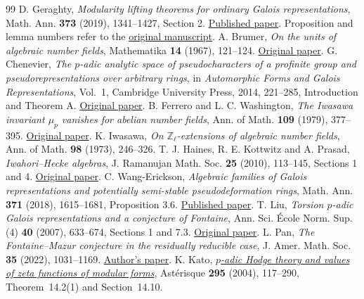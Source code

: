 \documentclass[a4paper,11pt]{article}
\theoremstyle{definition}
\theoremstyle{remark}
\newcommand{\ZZ}{\mathbb Z}\newcommand{\ord}{\operatorname{ord}}
\numberwithin{equation}{section}
\begin{document}
\begin{thebibliography}{99}
 D. Geraghty, \emph{Modularity lifting theorems for ordinary Galois representations}, Math. Ann. \textbf{373} (2019), 1341--1427, Section 2. \href{https://doi.org/10.1007/s00208-018-1742-4}{Published paper}. Proposition and lemma numbers refer to the \href{https://citeseerx.ist.psu.edu/document?doi=8faa2d675c94ae78d0ac8ebb3f9d4f69ede42d44\&repid=rep1\&type=pdf}{original manuscript}.
 A. Brumer, \emph{On the units of algebraic number fields}, Mathematika \textbf{14} (1967), 121--124. \href{https://doi.org/10.1112/S0025579300003703}{Original paper}.
 G. Chenevier, \emph{The \(p\)-adic analytic space of pseudocharacters of a profinite group and pseudorepresentations over arbitrary rings}, in \emph{Automorphic Forms and Galois Representations}, Vol.~1, Cambridge University Press, 2014, 221--285, Introduction and Theorem A. \href{https://gaetan.chenevier.perso.math.cnrs.fr/articles/determinants.pdf}{Original paper}.
 B. Ferrero and L. C. Washington, \emph{The Iwasawa invariant \(\mu_p\) vanishes for abelian number fields}, Ann. of Math. \textbf{109} (1979), 377--395. \href{https://doi.org/10.2307/1971116}{Original paper}.
 K. Iwasawa, \emph{On \(\ZZ_\ell\)-extensions of algebraic number fields}, Ann. of Math. \textbf{98} (1973), 246--326.
 T. J. Haines, R. E. Kottwitz and A. Prasad, \emph{Iwahori--Hecke algebras}, J. Ramanujan Math. Soc. \textbf{25} (2010), 113--145, Sections 1 and 4. \href{https://arxiv.org/abs/math/0309168}{Original paper}.
 C. Wang-Erickson, \emph{Algebraic families of Galois representations and potentially semi-stable pseudodeformation rings}, Math. Ann. \textbf{371} (2018), 1615--1681, Proposition 3.6. \href{https://doi.org/10.1007/s00208-017-1557-8}{Published paper}.
 T. Liu, \emph{Torsion \(p\)-adic Galois representations and a conjecture of Fontaine}, Ann. Sci. \'Ecole Norm. Sup. (4) \textbf{40} (2007), 633--674, Sections 1 and 7.3. \href{https://www.math.purdue.edu/~tongliu/pub/fontainel.pdf}{Original paper}.
 L. Pan, \emph{The Fontaine--Mazur conjecture in the residually reducible case}, J. Amer. Math. Soc. \textbf{35} (2022), 1031--1169. \href{https://arxiv.org/abs/1901.07166}{Author's paper}.
 K. Kato, \href{https://archive.numdam.org/item/AST_2004__295__117_0.pdf}{\emph{\(p\)-adic Hodge theory and values of zeta functions of modular forms}}, Ast\'erisque \textbf{295} (2004), 117--290, Theorem~14.2(1) and Section~14.10.
\end{thebibliography}\endgroup
\end{document}

